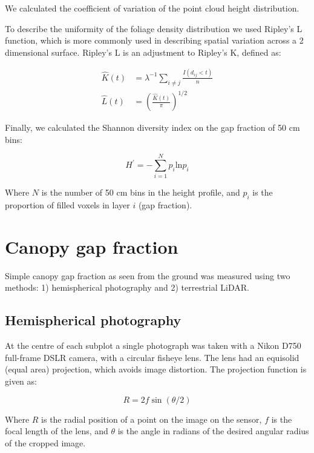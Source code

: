 \documentclass[11pt,a4paper]{article}
\begin{document}
We calculated the coefficient of variation of the point cloud height distribution.

To describe the uniformity of the foliage density distribution we used Ripley's L function, which is more commonly used in describing spatial variation across a 2 dimensional surface. Ripley's L is an adjustment to Ripley's K, defined as:

\begin{align}
	\widehat{K}(t) &= \lambda^{-1} \sum_{i\neq{}j} \frac{I(d_{ij} < t)}{n} \\
	\widehat{L}(t) &= \left(\frac{\widehat{K}(t)}{\pi}\right)^{1/2}
\end{align}

Finally, we calculated the Shannon diversity index on the gap fraction of 50 cm bins:

\begin{equation}
	H^{\prime{}} = - \sum_{i=1}^{N} p_{i} \text{ln} p_{i}
\end{equation}

Where $N$ is the number of 50 cm bins in the height profile, and $p_{i}$ is the proportion of filled voxels in layer $i$ (gap fraction).

\section{Canopy gap fraction}

Simple canopy gap fraction as seen from the ground was measured using two methods: 1) hemispherical photography and 2) terrestrial LiDAR. 

\subsection{Hemispherical photography}

At the centre of each subplot a single photograph was taken with a Nikon D750 full-frame DSLR camera, with a circular fisheye lens. The lens had an equisolid (equal area) projection, which avoids image distortion. The projection function is given as:

\begin{equation}
	R = 2f \sin{(\theta{}/2)}
\end{equation}

Where $R$ is the radial position of a point on the image on the sensor, $f$ is the focal length of the lens, and $\theta{}$ is the angle in radians of the desired angular radius of the cropped image. 
\end{document}
